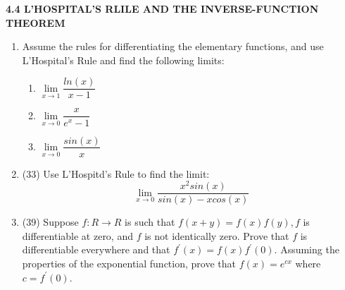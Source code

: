 \documentclass[fleqn]{article}
\begin{document}
  \textbf{4.4 L'HOSPITAL'S RLILE AND THE INVERSE-FUNCTION THEOREM}
  \begin{enumerate}
    \item Assume the rules for differentiating the elementary functions, and use L'Hospital's Rule
    and find the following limits: 
    \begin{enumerate}
      \item $\lim\limits_{x \to 1} \dfrac{ln(x)}{x-1}$



      \item $\lim\limits_{x \to 0} \dfrac{x}{e^x-1}$



      \item $\lim\limits_{x \to 0} \dfrac{sin(x)}{x}$



    \end{enumerate}

    \item (33) Use L'Hospitd's Rule to find the limit:
    $$
      \lim\limits_{x \to 0} \dfrac{x^2 sin(x)}{sin(x)-x cos(x)}
    $$



    \item (39) Suppose $f: R \longrightarrow R$ is such that $f(x+y)=f(x)f(y), f$ is differentiable at zero, and $f$ is
    not identically zero. Prove that $f$ is differentiable everywhere and that $f^'(x)=f(x)f^'(0)$.
    Assuming the properties of the exponential function, prove that $f(x)=e^{cx}$ where $c=f^'(0)$.



  \end{enumerate}
\end{document}
